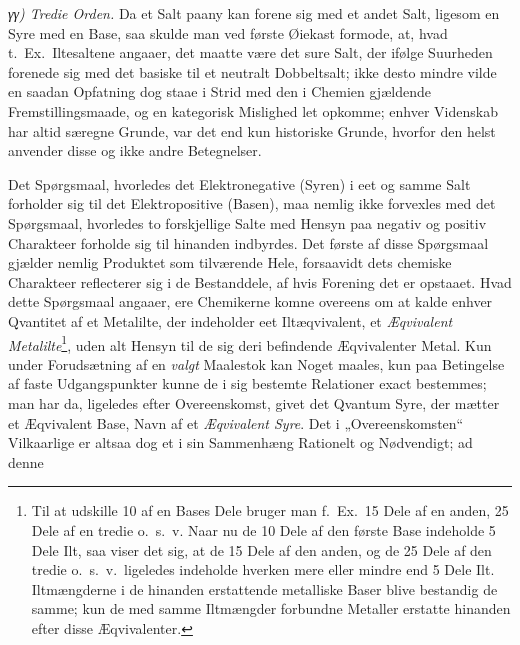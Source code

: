 \documentclass[12pt,a4paper]{book}
\begin{document}
\emph{γγ) Tredie Orden.} Da et Salt paany kan forene sig
med et andet Salt, ligesom en Syre med en Base, saa
skulde man ved første Øiekast formode, at, hvad t.\ Ex.\ Iltesaltene
angaaer, det maatte være det sure Salt, der ifølge
Suurheden forenede sig med det basiske til et neutralt Dobbeltsalt;
ikke desto mindre vilde en saadan Opfatning dog staae
i Strid med den i Chemien gjældende Fremstillingsmaade,
og en kategorisk Mislighed let opkomme; enhver Videnskab
har altid særegne Grunde, var det end kun historiske Grunde,
hvorfor den helst anvender disse og ikke andre Betegnelser.

Det Spørgsmaal, hvorledes det Elektronegative (Syren)
i eet og samme Salt forholder sig til det Elektropositive
(Basen), maa nemlig ikke forvexles med det Spørgsmaal,
hvorledes to forskjellige Salte med Hensyn paa negativ og
positiv Charakteer forholde sig til hinanden indbyrdes. Det
første af disse Spørgsmaal gjælder nemlig Produktet som tilværende
Hele, forsaavidt dets chemiske Charakteer reflecterer
sig i de Bestanddele, af hvis Forening det er opstaaet. Hvad
dette Spørgsmaal angaaer, ere Chemikerne komne overeens
om at kalde enhver Qvantitet af et Metalilte, der indeholder
eet Iltæqvivalent, et \emph{Æqvivalent Metalilte}\footnote{Til at
udskille 10 af en Bases Dele bruger man f.\ Ex.\ 15 Dele
af en anden, 25 Dele af en tredie o.\ s.\ v. Naar nu de 10 Dele
af den første Base indeholde 5 Dele Ilt, saa viser det sig, at
de 15 Dele af den anden, og de 25 Dele af den tredie o.\ s.\ v.\
ligeledes indeholde hverken mere eller mindre end 5 Dele Ilt.
Iltmængderne i de hinanden erstattende metalliske Baser blive
bestandig de samme; kun de med samme Iltmængder forbundne
Metaller erstatte hinanden efter disse Æqvivalenter.}, uden alt
Hensyn til de sig deri befindende Æqvivalenter Metal. Kun
under Forudsætning af en \emph{valgt} Maalestok kan Noget
maales, kun paa Betingelse af faste Udgangspunkter kunne
\setcounter{footnote}{0}
de i sig bestemte Relationer exact bestemmes; man har da,
ligeledes efter Overeenskomst, givet det Qvantum Syre, der
mætter et Æqvivalent Base, Navn af et \emph{Æqvivalent
Syre}. Det i „Overeenskomsten“ Vilkaarlige er altsaa dog
et i sin Sammenhæng Rationelt og Nødvendigt; ad denne
\end{document}

